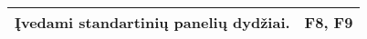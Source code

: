 \documentclass[a4paper,12pt]{article}
\begin{document}
\begin{frame}
\begin{tabular}{|l|c|}
Įvedami standartinių panelių dydžiai.			& F8, F9							\\ \hline

\end{tabular}
\end{frame}

\clearpage
\end{document}
